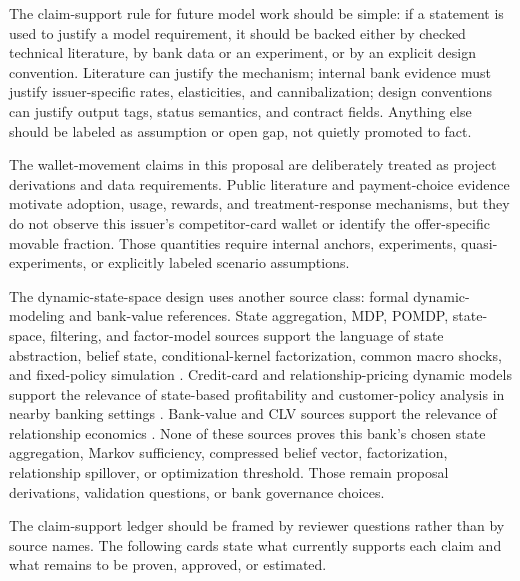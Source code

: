 \documentclass[11pt]{article}
\newcommand{\1}{\mathbf{1}}
\begin{document}
The claim-support rule for future model work should be simple: if a statement
is used to justify a model requirement, it should be backed either by checked
technical literature, by bank data or an experiment, or by an explicit design
convention. Literature can justify the mechanism; internal bank evidence must
justify issuer-specific rates, elasticities, and cannibalization; design
conventions can justify output tags, status semantics, and contract fields.
Anything else should be labeled as assumption or open gap, not quietly promoted
to fact.

The wallet-movement claims in this proposal are deliberately treated as project
derivations and data requirements. Public literature and payment-choice
evidence motivate adoption, usage, rewards, and treatment-response mechanisms,
but they do not observe this issuer's competitor-card wallet or identify the
offer-specific movable fraction. Those quantities require internal anchors,
experiments, quasi-experiments, or explicitly labeled scenario assumptions.

The dynamic-state-space design uses another source class: formal
dynamic-modeling and bank-value references. State aggregation, MDP, POMDP,
state-space, filtering, and factor-model sources support the language of state
abstraction, belief state, conditional-kernel factorization, common macro
shocks, and fixed-policy simulation \citep{bean1987aggregation,puterman1994mdp,smallwood1973pomdp,
kaelbling1998pomdp,durbinkoopman2012ssm,westharrison1997bfdm,doucet2001smc,
ledoux2005recursivefilters,bernankeboivin2003datarich,
bernankeboivineliasz2005favar,stockwatson2005factorvar}. Credit-card and
relationship-pricing dynamic models support the relevance of state-based
profitability and customer-policy analysis in nearby banking settings
\citep{thomas2011creditcardmdp,lewis2005relationshippricing}. Bank-value and
CLV sources support the relevance of relationship economics
\citep{egan2022bankvalue,berger1998clv,rust2004return,venkatesan2004clv}.
None of these sources proves this bank's chosen state aggregation, Markov
sufficiency, compressed belief vector, factorization, relationship spillover,
or optimization threshold. Those remain proposal derivations, validation
questions, or bank governance choices.

The claim-support ledger should be framed by reviewer questions rather than by
source names. The following cards state what currently supports each claim and
what remains to be proven, approved, or estimated.
\end{document}
